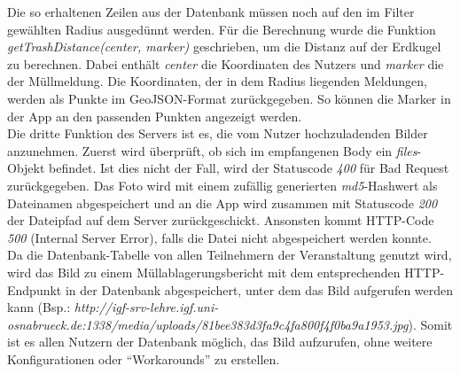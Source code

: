 \documentclass[a4paper, 11pt, DIV=11, listof=numbered, numbers=noenddot]{scrartcl}
\begin{document}
	Die so erhaltenen Zeilen aus der Datenbank müssen noch auf den im Filter gewählten Radius ausgedünnt werden. Für die Berechnung wurde die Funktion \textit{getTrashDistance(center, marker)} geschrieben, um die Distanz auf der Erdkugel zu berechnen. Dabei enthält \textit{center} die Koordinaten des Nutzers und \textit{marker} die der Müllmeldung. Die Koordinaten, der in dem Radius liegenden Meldungen, werden als Punkte im GeoJSON-Format zurückgegeben. So können die Marker in der App an den passenden Punkten angezeigt werden.\\
	Die dritte Funktion des Servers ist es, die vom Nutzer hochzuladenden Bilder anzunehmen. Zuerst wird überprüft, ob sich im empfangenen Body ein \textit{files}-Objekt befindet. Ist dies nicht der Fall, wird der Statuscode \textit{400} für Bad Request zurückgegeben. Das Foto wird mit einem zufällig generierten \textit{md5}-Hashwert als Dateinamen abgespeichert und an die App wird zusammen mit Statuscode \textit{200} der Dateipfad auf dem Server zurückgeschickt. Ansonsten kommt HTTP-Code \textit{500} (Internal Server Error), falls die Datei nicht abgespeichert werden konnte.\\
	Da die Datenbank-Tabelle von allen Teilnehmern der Veranstaltung genutzt wird, wird das Bild zu einem Müllablagerungsbericht mit dem entsprechenden HTTP-Endpunkt in der Datenbank abgespeichert, unter dem das Bild aufgerufen werden kann (Bsp.: \textit{http://igf-srv-lehre.igf.uni-osnabrueck.de:1338/media/uploads/81bee383d3fa9c4fa800f4f0ba9a1953.jpg}). Somit ist es allen Nutzern der Datenbank möglich, das Bild aufzurufen, ohne weitere Konfigurationen oder \enquote{Workarounds} zu erstellen.
\end{document}
